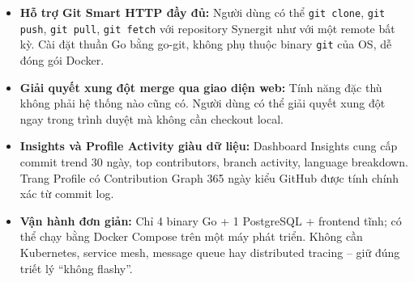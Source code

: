\begin{itemize}
\item \textbf{Hỗ trợ Git Smart HTTP đầy đủ:} Người dùng có thể \texttt{git clone}, \texttt{git push}, \texttt{git pull}, \texttt{git fetch} với repository Synergit như với một remote bất kỳ. Cài đặt thuần Go bằng go-git, không phụ thuộc binary \texttt{git} của OS, dễ đóng gói Docker.
\item \textbf{Giải quyết xung đột merge qua giao diện web:} Tính năng đặc thù không phải hệ thống nào cũng có. Người dùng có thể giải quyết xung đột ngay trong trình duyệt mà không cần checkout local.
\item \textbf{Insights và Profile Activity giàu dữ liệu:} Dashboard Insights cung cấp commit trend 30 ngày, top contributors, branch activity, language breakdown. Trang Profile có Contribution Graph 365 ngày kiểu GitHub được tính chính xác từ commit log.
\item \textbf{Vận hành đơn giản:} Chỉ 4 binary Go + 1 PostgreSQL + frontend tĩnh; có thể chạy bằng Docker Compose trên một máy phát triển. Không cần Kubernetes, service mesh, message queue hay distributed tracing -- giữ đúng triết lý ``không flashy''.
\end{itemize}

